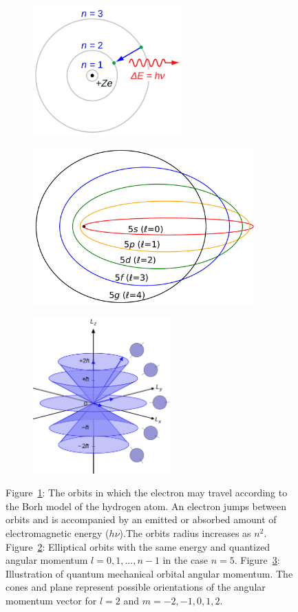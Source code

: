 	\begin{figure}[H]
		\begin{subfigure}{0.4\linewidth}
			\centering
			\includegraphics[height=5cm]{fig/chapt2/Bohr_atom_model.pdf}\\
			\caption{\label{fig:quantum-numbers:A}}
		\end{subfigure}
		\begin{subfigure}{0.5\linewidth}
			\centering
			\includegraphics[height=6cm]{fig/chapt2/Sommerfeld_ellipses.pdf}
			\caption{\label{fig:quantum-numbers:B}}
		\end{subfigure}
		\begin{subfigure}{\linewidth}
			\centering
			\includegraphics[height=6cm]{fig/chapt2/Vector_model_of_orbital_angular_momentum.pdf}
			\caption{\label{fig:quantum-numbers:C}}
		\end{subfigure}
		\caption{\label{fig:quantum-numbers} Figure~\ref{fig:quantum-numbers:A}: The orbits in which the electron may travel according to the Borh model of the hydrogen atom. An electron jumps between orbits and is accompanied by an emitted or absorbed amount of electromagnetic energy ($h\nu$).The orbits radius increases as $n^2$. Figure~\ref{fig:quantum-numbers:B}: Elliptical orbits with the same energy and quantized angular momentum $l= 0, 1,...,n-1$ in the case $n=5$. Figure~\ref{fig:quantum-numbers:C}: Illustration of quantum mechanical orbital angular momentum. The cones and plane represent possible orientations of the angular momentum vector for $l=2$ and $m=-2,-1,0,1,2$.}
	\end{figure}
	
